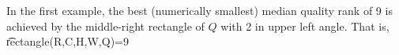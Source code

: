 In the first example, the best (numerically smallest) median quality rank of 9 is achieved by the middle-right rectangle of $Q$ with 2 in upper left angle. That is,
\t{rectangle(R,C,H,W,Q)=9}